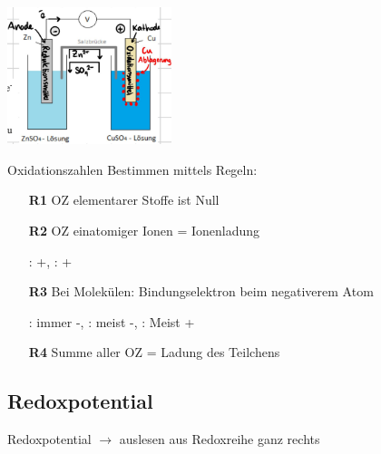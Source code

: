     \begin{minipage}{0.5\linewidth}
        \includegraphics[height=4cm]{pictures/Galv.png}
    \end{minipage}
    \hfill
    \begin{minipage}{0.5\linewidth}
        Oxidationszahlen Bestimmen mittels Regeln:
        
        \begin{itemize}
            \item[\textbf{R1}] OZ elementarer Stoffe ist Null
            \item[]            
            \item[\textbf{R2}] OZ einatomiger Ionen = Ionenladung
            \item[]             : +,  : +
            \item[\textbf{R3}] Bei Molekülen: Bindungselektron beim negativerem Atom
            \item[]             : immer -, : meist -, : Meist +
            \item[\textbf{R4}] Summe aller OZ = Ladung des Teilchens
        \end{itemize}
    \end{minipage}
\subsection{Redoxpotential}
    Redoxpotential $\to$ auslesen aus Redoxreihe ganz rechts 
    
